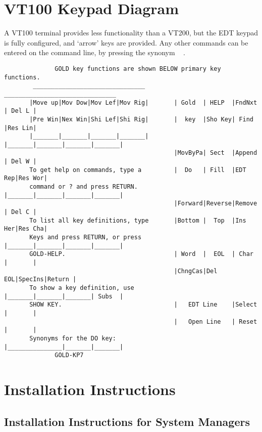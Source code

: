 \newpage

\section{VT100 Keypad Diagram}

A VT100 terminal provides less functionality than a VT200, but the EDT keypad
is fully configured, and `arrow' keys are provided. Any other commands can be
entered on the command line, by pressing the  synonym \gold\
 .

\begin{small}
\begin{verbatim}
              GOLD key functions are shown BELOW primary key functions.
        _______________________________         _______________________________
       |Move up|Mov Dow|Mov Lef|Mov Rig|       | Gold  | HELP  |FndNxt | Del L |
       |Pre Win|Nex Win|Shi Lef|Shi Rig|       |  key  |Sho Key| Find  |Res Lin|
       |_______|_______|_______|_______|       |_______|_______|_______|_______|
                                               |MovByPa| Sect  |Append | Del W |
       To get help on commands, type a         |  Do   | Fill  |EDT Rep|Res Wor|
       command or ? and press RETURN.          |_______|_______|_______|_______|
                                               |Forward|Reverse|Remove | Del C |
       To list all key definitions, type       |Bottom |  Top  |Ins Her|Res Cha|
       Keys and press RETURN, or press         |_______|_______|_______|_______|
       GOLD-HELP.                              | Word  |  EOL  | Char  |       |
                                               |ChngCas|Del EOL|SpecIns|Return |
       To show a key definition, use           |_______|_______|_______| Subs  |
       SHOW KEY.                               |   EDT Line    |Select |       |
                                               |   Open Line   | Reset |       |
       Synonyms for the DO key:                |_______________|_______|_______|
              GOLD-KP7
\end{verbatim}
\end{small}

\newpage

\section{Installation Instructions}
\subsection{Installation Instructions for System Managers}
\label{system_install}

